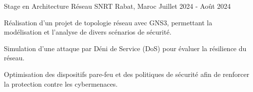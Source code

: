 \begin{cventries}

  \cventry
    {Stage en Architecture Réseau} %
    {SNRT} %
    {Rabat, Maroc} %
    {Juillet 2024 - Août 2024} %
    {
      \begin{cvitems} %
        \item {Réalisation d’un projet de topologie réseau avec GNS3, permettant la modélisation et l’analyse de divers scénarios de sécurité.}
        \item {Simulation d’une attaque par Déni de Service (DoS) pour évaluer la résilience du réseau.}
        \item {Optimisation des dispositifs pare-feu et des politiques de sécurité afin de renforcer la protection contre les cybermenaces.}
      \end{cvitems}
    }
\end{cventries}
